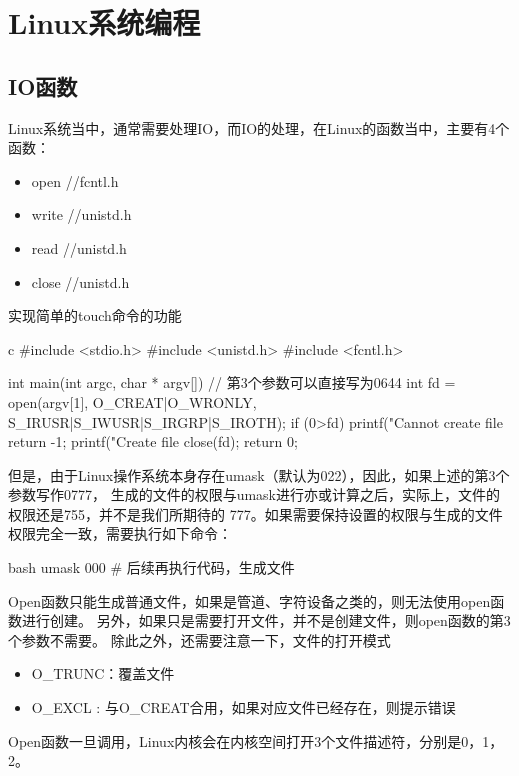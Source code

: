 \section{Linux系统编程}

\subsection{IO函数}
Linux系统当中，通常需要处理IO，而IO的处理，在Linux的函数当中，主要有4个函数：
\begin{itemize}
  \item open //fcntl.h
  \item write //unistd.h
  \item read //unistd.h
  \item close //unistd.h
\end{itemize}

实现简单的touch命令的功能
\begin{code-block}{c}
#include <stdio.h>
#include <unistd.h>
#include <fcntl.h>

int main(int argc, char * argv[])
{
        // 第3个参数可以直接写为0644
        int fd = open(argv[1], O_CREAT|O_WRONLY,
                S_IRUSR|S_IWUSR|S_IRGRP|S_IROTH);
        if (0>fd)
        {
                printf("Cannot create file %
                return -1;
        }
        printf("Create file %
        close(fd);
        return 0;
}
\end{code-block}

但是，由于Linux操作系统本身存在umask（默认为022），因此，如果上述的第3个参数写作0777，
生成的文件的权限与umask进行亦或计算之后，实际上，文件的权限还是755，并不是我们所期待的
777。如果需要保持设置的权限与生成的文件权限完全一致，需要执行如下命令：
\begin{code-block}{bash}
umask 000
# 后续再执行代码，生成文件
\end{code-block}

Open函数只能生成普通文件，如果是管道、字符设备之类的，则无法使用open函数进行创建。
另外，如果只是需要打开文件，并不是创建文件，则open函数的第3个参数不需要。
除此之外，还需要注意一下，文件的打开模式
\begin{itemize}
  \item O\_TRUNC：覆盖文件
  \item O\_EXCL : 与O\_CREAT合用，如果对应文件已经存在，则提示错误
\end{itemize}

Open函数一旦调用，Linux内核会在内核空间打开3个文件描述符，分别是0，1，2。

